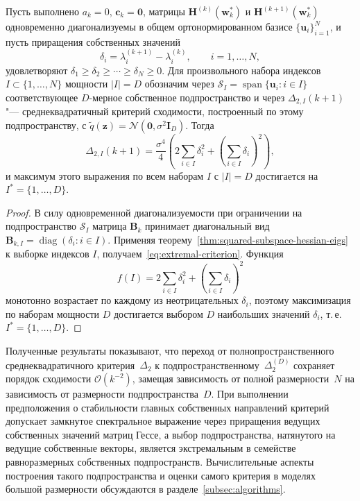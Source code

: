 \begin{proposition}
    \label{prop:extremal-topD}
    Пусть выполнено $a_k=0$, $\mathbf c_k=\mathbf 0$, матрицы $\mathbf H^{(k)}(\mathbf w_k^*)$ и $\mathbf H^{(k+1)}(\mathbf w_k^*)$ одновременно диагонализуемы в общем ортонормированном базисе $\{\mathbf u_i\}_{i=1}^N$, и пусть приращения собственных значений
    \begin{equation}
        \delta_i = \lambda_i^{(k+1)} - \lambda_i^{(k)},
        \qquad i=1, \ldots, N,
    \end{equation}
    удовлетворяют $\delta_1 \geqslant \delta_2 \geqslant \cdots \geqslant \delta_N \geqslant 0$. Для произвольного набора индексов $I\subset \{1, \ldots, N\}$ мощности $|I|=D$ обозначим через $\mathcal S_I = \operatorname{span}\{\mathbf u_i: i\in I\}$ соответствующее $D$-мерное собственное подпространство и через $\Delta_{2,I}(k+1)$ "--- среднеквадратичный критерий сходимости, построенный по этому подпространству, с $\tilde q(\mathbf z)=\mathcal N(\mathbf 0,\sigma^2 \mathbf I_D)$. Тогда
    \begin{equation}
        \label{eq:extremal-criterion}
        \Delta_{2,I}(k+1)
        =
        \frac{\sigma^4}{4}
        \left(
            2\sum_{i\in I}\delta_i^2
            +
            \left(\sum_{i\in I}\delta_i\right)^2
        \right),
    \end{equation}
    и максимум этого выражения по всем наборам $I$ с $|I|=D$ достигается на $I^* = \{1, \ldots, D\}$.
\end{proposition}

\begin{proof}
    В силу одновременной диагонализуемости при ограничении на подпространство $\mathcal S_I$ матрица $\mathbf B_k$ принимает диагональный вид $\mathbf B_{k,I} = \operatorname{diag}(\delta_i: i\in I)$. Применяя теорему~\ref{thm:squared-subspace-hessian-eigs} к выборке индексов $I$, получаем~\eqref{eq:extremal-criterion}. Функция
    \begin{equation}
        f(I) = 2\sum_{i\in I}\delta_i^2 + \left(\sum_{i\in I}\delta_i\right)^2
    \end{equation}
    монотонно возрастает по каждому из неотрицательных $\delta_i$, поэтому максимизация по наборам мощности $D$ достигается выбором $D$ наибольших значений $\delta_i$, т.\,е. $I^* = \{1, \ldots, D\}$.
\end{proof}

Полученные результаты показывают, что переход от полнопространственного среднеквадратичного критерия~$\Delta_2$ к подпространственному~$\Delta_2^{(D)}$ сохраняет порядок сходимости $\mathcal O(k^{-2})$, замещая зависимость от полной размерности~$N$ на зависимость от размерности подпространства~$D$. При выполнении предположения о стабильности главных собственных направлений критерий допускает замкнутое спектральное выражение через приращения ведущих собственных значений матриц Гессе, а выбор подпространства, натянутого на ведущие собственные векторы, является экстремальным в семействе равноразмерных собственных подпространств. Вычислительные аспекты построения такого подпространства и оценки самого критерия в моделях большой размерности обсуждаются в разделе~\ref{subsec:algorithms}.

